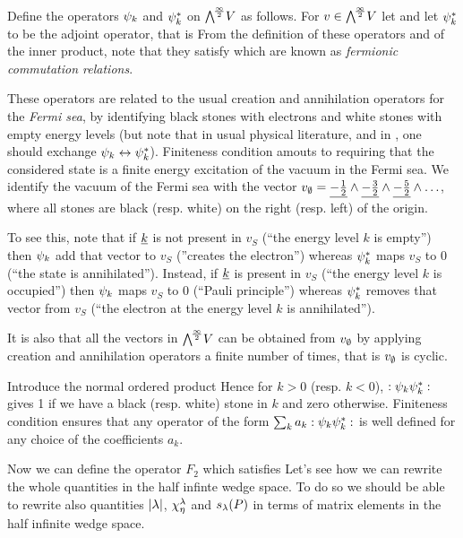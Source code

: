 \documentclass[../main/main.tex]{subfiles}
\begin{document}
Define the operators $\psi_k$ and $\psi_k^*$ on $\bigwedge^{\!\frac\infty2}\!V$ as follows. For $v\in\bigwedge^{\!\frac\infty2}\!V$ let
and let $\psi_k^*$ to be the adjoint operator, that is \st
{}
From the definition of these operators and of the inner product, note that they satisfy
which are known as \emph{fermionic commutation relations}. 

These operators are related to the usual creation and annihilation operators for the \emph{Fermi sea}, by identifying black stones with electrons and white stones with empty energy levels (but note that in usual physical literature, and in \cite{MJD}, one should exchange $\psi_k\leftrightarrow\psi_k^*$). Finiteness condition amouts to requiring that the considered state is a finite energy excitation of the vacuum in the Fermi sea. We identify the vacuum of the Fermi sea with the vector $v_\emptyset=\underline{-\frac12}\wedge\underline{-\frac32}\wedge\underline{-\frac52}\wedge\ldots$, where all stones are black (resp. white) on the right (resp. left) of the origin.

To see this, note that if $\underline{k}$ is not present in $v_S$ (``the energy level $k$ is empty'') then $\psi_k$ add that vector to $v_S$ (''creates the electron'') whereas $\psi_k^*$ maps $v_S$ to 0 (``the state is annihilated''). Instead, if $\underline{k}$ is present in $v_S$ (``the energy level $k$ is occupied'') then $\psi_k$ maps $v_S$ to 0 (``Pauli principle'') whereas $\psi_k^*$ removes that vector from $v_S$ (``the electron at the energy level $k$ is annihilated''). 

It is also that all the vectors in $\bigwedge^{\!\frac\infty2}\!V$ can be obtained from $v_\emptyset$ by applying creation and annihilation operators a finite number of times, that is $v_\emptyset$ is cyclic. 

Introduce the normal ordered product
Hence for $k>0$ (resp. $k<0$), $:{\psi_k\psi_k^*}:$ gives 1 if we have a black (resp. white) stone in $k$ and zero otherwise. Finiteness condition ensures that any operator of the form $\sum_{k}a_k:{\psi_k\psi_k^*}:$ is well defined for any choice of the coefficients $a_k$. 

Now we can define the operator $F_2$ 
which satisfies
Let's see how we can rewrite the whole quantities
in the half infinte wedge space. To do so we should be able to rewrite also quantities $|\lambda|$, $\chi^\lambda_\eta$ and $s_\lambda(P)$ in terms of matrix elements in the half infinite wedge space. 
\end{document}
